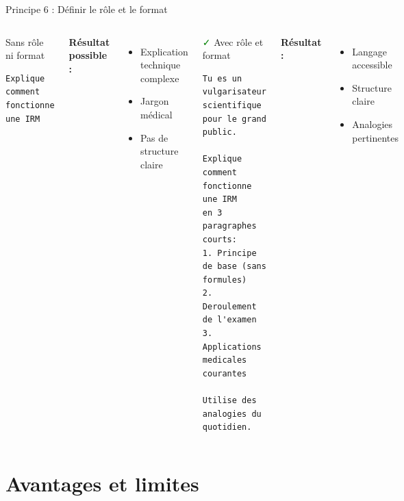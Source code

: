 \begin{frame}[fragile]{Principe 6 : Définir le rôle et le format}
\begin{columns}
\begin{alertblock}{\textcolor{red}{\faTimes} Sans rôle ni format}
\begin{lstlisting}[basicstyle=\ttfamily\tiny]
Explique comment fonctionne 
une IRM
\end{lstlisting}
\end{alertblock}

\textbf{Résultat possible :}
\begin{itemize}
    \item Explication technique complexe
    \item Jargon médical
    \item Pas de structure claire
\end{itemize}

\begin{exampleblock}{\textcolor{green}{\faCheck} Avec rôle et format}
\begin{lstlisting}[basicstyle=\ttfamily\tiny]
Tu es un vulgarisateur scientifique 
pour le grand public.

Explique comment fonctionne une IRM 
en 3 paragraphes courts:
1. Principe de base (sans formules)
2. Deroulement de l'examen
3. Applications medicales courantes

Utilise des analogies du quotidien.
\end{lstlisting}
\end{exampleblock}

\textbf{Résultat :}
\begin{itemize}
    \item Langage accessible
    \item Structure claire
    \item Analogies pertinentes
\end{itemize}
\end{columns}

\vspace{0.3cm}

\end{frame}


\section{Avantages et limites}

